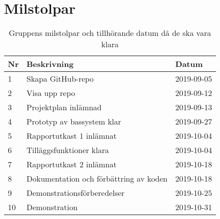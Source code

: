 \documentclass[a4paper]{article}
\begin{document}
\section{Milstolpar}

\begin{table}[H]
\begin{tabular}{| l | l | l |}
\hline
Nr & Beskrivning & Datum \\ \hline
1 & Skapa GitHub-repo & 2019-09-05 \\ \hline
2 & Visa upp repo & 2019-09-12 \\ \hline
3 & Projektplan inlämnad & 2019-09-13 \\ \hline
4 & Prototyp av bassystem klar & 2019-09-27 \\ \hline
5 & Rapportutkast 1 inlämnat & 2019-10-04 \\ \hline
6 & Tilläggsfunktioner klara & 2019-10-04 \\ \hline
7 & Rapportutkast 2 inlämnat & 2019-10-18 \\ \hline
8 & Dokumentation och förbättring av koden & 2019-10-18 \\ \hline
9 & Demonstrationsförberedelser & 2019-10-25 \\ \hline
10 & Demonstration & 2019-10-31 \\ \hline
\end{tabular}
\caption{Gruppens milstolpar och tillhörande datum då de ska vara klara}
\end{table}
\end{document}

